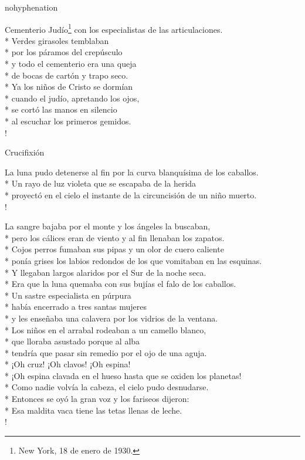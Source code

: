\documentclass[
    a5paper,
    DIV=10,
    12pt,
    notitlepage,
    oneside,]
{scrbook} %
\begin{document}
\begin{hyphenrules}{nohyphenation}
\begin{poem}{Cementerio Judío}{\footnote{New York, 18 de enero de 1930.}}{\vspace{-1em}}
con los especialistas de las articulaciones.\\*
Verdes girasoles temblaban\\*
por los páramos del crepúsculo\\*
y todo el cementerio era una queja\\*
de bocas de cartón y trapo seco.\\*
Ya los niños de Cristo se dormían\\*
cuando el judío, apretando los ojos,\\*
se cortó las manos en silencio\\*
al escuchar los primeros gemidos.\\!

\end{poem}

\begin{poem}{Crucifixión}{}{}

La luna pudo detenerse al fin por la curva blanquísima de los caballos.\\*
Un rayo de luz violeta que se escapaba de la herida\\*
proyectó en el cielo el instante de la circuncisión de un niño muerto.\\!

La sangre bajaba por el monte y los ángeles la buscaban,\\*
pero los cálices eran de viento y al fin llenaban los zapatos.\\*
Cojos perros fumaban sus pipas y un olor de cuero caliente\\*
ponía grises los labios redondos de los que vomitaban en las esquinas.\\*
Y llegaban largos alaridos por el Sur de la noche seca.\\*
Era que la luna quemaba con sus bujías el falo de los caballos.\\*
Un sastre especialista en púrpura\\*
había encerrado a tres santas mujeres\\*
y les enseñaba una calavera por los vidrios de la ventana.\\*
Los niños en el arrabal rodeaban a un camello blanco,\\*
que lloraba asustado porque al alba\\*
tendría que pasar sin remedio por el ojo de una aguja.\\*
¡Oh cruz! ¡Oh clavos! ¡Oh espina!\\*
¡Oh espina clavada en el hueso hasta que se oxiden los planetas!\\*
Como nadie volvía la cabeza, el cielo pudo desnudarse.\\*
Entonces se oyó la gran voz y los fariseos dijeron:\\*
Esa maldita vaca tiene las tetas llenas de leche.\\!


\end{poem}
\end{hyphenrules}
\end{document}
